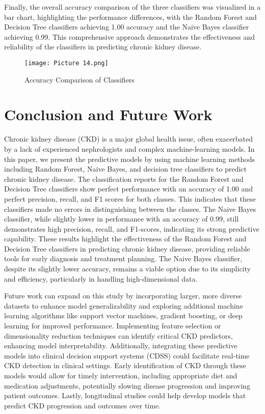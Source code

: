 \documentclass[conference]{IEEEtran}
\begin{document}
Finally, the overall accuracy comparison of the three classifiers was visualized in a bar chart, highlighting the performance differences, with the Random Forest and Decision Tree classifiers achieving 1.00 accuracy and the Naive Bayes classifier achieving 0.99. This comprehensive approach demonstrates the effectiveness and reliability of the classifiers in predicting chronic kidney disease.

\begin{figure}
\centering
\texttt{[image: Picture 14.png]}
\caption{Accuracy Comparison of Classifiers} \label{fig14}
\end{figure}


\section{Conclusion and Future Work}

Chronic kidney disease (CKD) is a major global health issue, often exacerbated by a lack of experienced nephrologists and complex machine-learning models. In this paper, we present the predictive models by using machine learning methods including Random Forest, Naive Bayes, and decision tree classifiers to predict chronic kidney disease. The classification reports for the Random Forest and Decision Tree classifiers show perfect performance with an accuracy of 1.00 and perfect precision, recall, and F1 scores for both classes. This indicates that these classifiers made no errors in distinguishing between the classes. The Naive Bayes classifier, while slightly lower in performance with an accuracy of 0.99, still demonstrates high precision, recall, and F1-scores, indicating its strong predictive capability.
These results highlight the effectiveness of the Random Forest and Decision Tree classifiers in predicting chronic kidney disease, providing reliable tools for early diagnosis and treatment planning. The Naive Bayes classifier, despite its slightly lower accuracy, remains a viable option due to its simplicity and efficiency, particularly in handling high-dimensional data.

Future work can expand on this study by incorporating larger, more diverse datasets to enhance model generalizability and exploring additional machine learning algorithms like support vector machines, gradient boosting, or deep learning for improved performance. Implementing feature selection or dimensionality reduction techniques can identify critical CKD predictors, enhancing model interpretability. Additionally, integrating these predictive models into clinical decision support systems (CDSS) could facilitate real-time CKD detection in clinical settings. Early identification of CKD through these models would allow for timely intervention, including appropriate diet and medication adjustments, potentially slowing disease progression and improving patient outcomes. Lastly, longitudinal studies could help develop models that predict CKD progression and outcomes over time.
\end{document}
